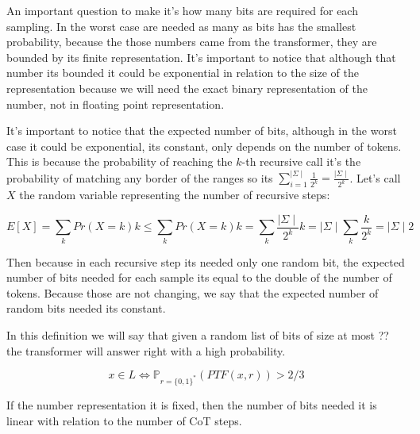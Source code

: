 An important question to make it's how many bits are required for each sampling. 
In the worst case are needed as many as bits has the smallest probability, because the those numbers came from the transformer, they are bounded by its finite representation. 
It's important to notice that although that number its bounded it could be exponential in relation to the size of the representation because we will need the exact binary representation of the number, not in floating point representation. 


It's important to notice that the expected number of bits, although in the worst case it could be exponential, its constant, only depends on the number of tokens. 
This is because the probability of reaching the $k$-th recursive call it's the probability of matching any border of the ranges so its $\sum_{i=1}^{\mid \Sigma \mid} \frac{1}{2^k} = \frac{\mid \Sigma \mid}{2^k}$. 
Let's call $X$ the random variable representing the number of recursive steps:

\[
E[X] = \sum_k Pr(X = k) k \leq \sum_k Pr(X = k) k = \sum_k \frac{\mid \Sigma \mid}{2^k} k = \mid \Sigma \mid \sum_k \frac{k}{2^k} = \mid \Sigma \mid 2
\]

Then because in each recursive step its needed only one random bit, the expected number of bits needed for each sample its equal to the double of the number of tokens. 
Because those are not changing, we say that the expected number of random bits needed its constant.


In this definition we will say that given a random list of bits of size at most ?? the transformer will answer right with a high probability.

\begin{equation*}
    x \in L \iff \mathbb{P}_{r = \{0,1\}^*} (PTF(x, r)) > 2/3
\end{equation*}

If the number representation it is fixed, then the number of bits needed it is linear with relation to the number of CoT steps. 


